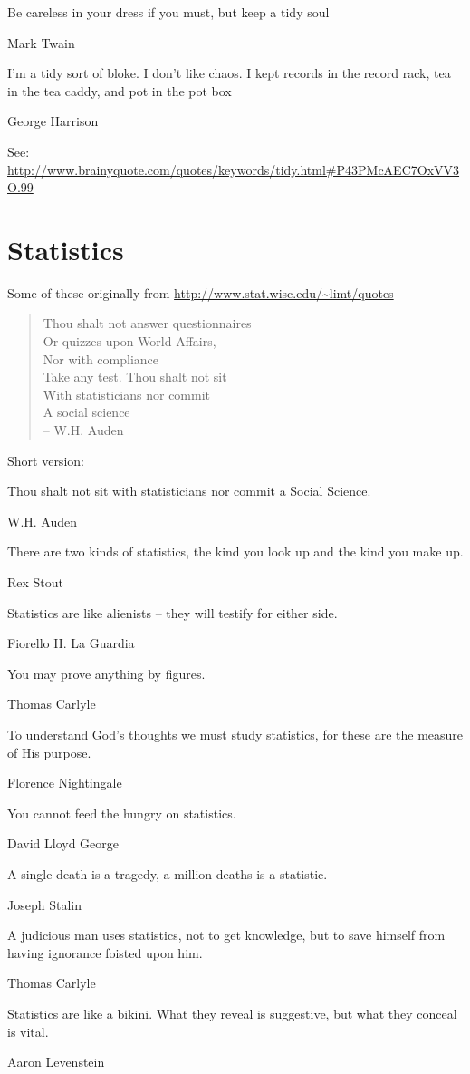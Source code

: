 \epigraph{Be careless in your dress if you must, but keep a tidy soul}{Mark Twain}

\epigraph{I'm a tidy sort of bloke. I don't like chaos. I kept records in the record rack, tea in the tea caddy, and pot in the pot box}{George Harrison}

See: \url{http://www.brainyquote.com/quotes/keywords/tidy.html#P43PMcAEC7OxVV3O.99}

\section{Statistics}

Some of these originally from \url{http://www.stat.wisc.edu/~limt/quotes}

\begin{verse}
Thou shalt not answer questionnaires\\
Or quizzes upon World Affairs,\\
Nor with compliance\\
Take any test. Thou shalt not sit\\
With statisticians nor commit\\
A social science\\
-- W.H. Auden 
\end{verse}

Short version:
\epigraph{Thou shalt not sit with statisticians nor commit a Social Science.}{W.H. Auden}


\epigraph{There are two kinds of statistics, the kind you look up and the kind you make up.}{Rex Stout}

\epigraph{Statistics are like alienists -- they will testify for either side.}{Fiorello H. La Guardia}

\epigraph{You may prove anything by figures.}{Thomas Carlyle}


\epigraph{To understand God's thoughts we must study statistics, for these are the measure of His purpose.}{Florence Nightingale}

\epigraph{You cannot feed the hungry on statistics.}{David Lloyd George}

\epigraph{A single death is a tragedy, a million deaths is a statistic.}{Joseph Stalin}

\epigraph{A judicious man uses statistics, not to get knowledge, but to save himself from having ignorance foisted upon him.}{Thomas Carlyle}

\epigraph{Statistics are like a bikini.  What they reveal is suggestive, but what they conceal is vital.}{Aaron Levenstein}


